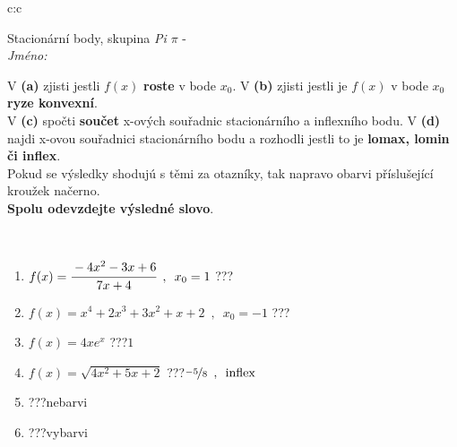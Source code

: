 \documentclass[10pt]{report}
\begin{document}
\newpage
\thispagestyle{empty}
\begin{tabular}{c:c}
\begin{minipage}[c][104.5mm][t]{0.5\linewidth}
\begin{center}
\vspace{7mm}
{\huge Stacionární body, skupina \textit{Pi $\pi$} -}\\[5mm]
\textit{Jméno:}\phantom{xxxxxxxxxxxxxxxxxxxxxxxxxxxxxxxxxxxxxxxxxxxxxxxxxxxxxxxxxxxxxxxxx}\\[5mm]
\begin{minipage}{0.95\linewidth}
\begin{center}
{\small V \textbf{(a)} zjisti jestli $f(x)$ \textbf{roste} v bode $x_0$. V \textbf{(b)} zjisti jestli je $f(x)$ v bode $x_0$ \textbf{ryze konvexní}.\\V \textbf{(c)} spočti \textbf{součet} x-ových souřadnic stacionárního a inflexního bodu. V \textbf{(d)} najdi x-ovou souřadnici stacionárního bodu a rozhodli jestli to je \textbf{lomax, lomin či inflex}.\\Pokud se výsledky shodujú s těmi za otazníky, tak napravo obarvi příslušející kroužek načerno.\\\textbf{Spolu odevzdejte výsledné slovo}}.
\end{center}
\end{minipage}
\\[1mm]
\begin{minipage}{0.79\linewidth}
\begin{center}
\begin{varwidth}{\linewidth}
\begin{enumerate}
\normalsize
\item $f(x)=\cfrac{-4x^2-3x+6}{7x+4}\enspace , \enspace x_0=1$\quad \dotfill\; ???\;\dotfill \quad {}
\item $f(x)=x^4+2x^3+3x^2+x+2\enspace , \enspace x_0=-1$\quad \dotfill\; ???\;\dotfill \quad {}
\item $f(x)=4xe^{x}$\quad \dotfill\; ???\;\dotfill \quad $1$
\item $f(x)=\sqrt{4x^2+5x+2}$\quad \dotfill\; ???\;\dotfill \quad $\nicefrac{-5}{8}\enspace , \enspace\mathrm{inflex}$
\item \quad \dotfill\; ???\;\dotfill \quad nebarvi
\item \quad \dotfill\; ???\;\dotfill \quad vybarvi
\end{enumerate}
\end{varwidth}
\end{center}

\end{minipage}
\end{center}
\end{minipage}
\end{tabular}
\end{document}
